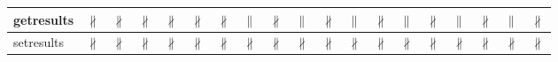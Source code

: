 \documentclass[10pt]{article}
\begin{document}
\begin{longtable}{|l|l|l|l|l|l|l|l|l|l|l|l|l|l|l|l|l|l|l|}
\hline
getresults&{\color{BrickRed}$\nparallel$}&{\color{BrickRed}$\nparallel$}&{\color{BrickRed}$\nparallel$}&{\color{BrickRed}$\nparallel$}&{\color{BrickRed}$\nparallel$}&{\color{BrickRed}$\nparallel$}&{\color{blue}$\parallel$}&{\color{BrickRed}$\nparallel$}&{\color{blue}$\parallel$}&{\color{BrickRed}$\nparallel$}&{\color{blue}$\parallel$}&{\color{BrickRed}$\nparallel$}&{\color{blue}$\parallel$}&{\color{BrickRed}$\nparallel$}&{\color{blue}$\parallel$}&{\color{BrickRed}$\nparallel$}&{\color{blue}$\parallel$}&{\color{BrickRed}$\nparallel$}\\
\hline
setresults&{\color{BrickRed}$\nparallel$}&{\color{BrickRed}$\nparallel$}&{\color{BrickRed}$\nparallel$}&{\color{BrickRed}$\nparallel$}&{\color{BrickRed}$\nparallel$}&{\color{BrickRed}$\nparallel$}&{\color{BrickRed}$\nparallel$}&{\color{BrickRed}$\nparallel$}&{\color{BrickRed}$\nparallel$}&{\color{BrickRed}$\nparallel$}&{\color{BrickRed}$\nparallel$}&{\color{BrickRed}$\nparallel$}&{\color{BrickRed}$\nparallel$}&{\color{BrickRed}$\nparallel$}&{\color{BrickRed}$\nparallel$}&{\color{BrickRed}$\nparallel$}&{\color{BrickRed}$\nparallel$}&{\color{BrickRed}$\nparallel$}\\
\hline
\end{longtable}
\newpage
\end{document}

